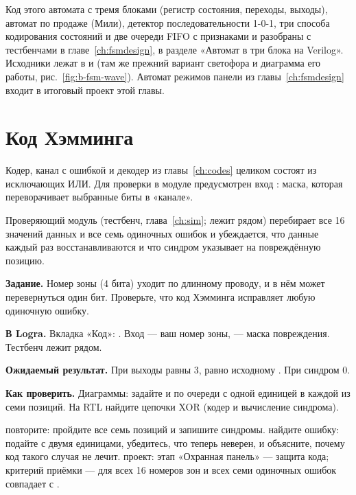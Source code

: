 Код этого автомата с тремя блоками (регистр состояния, переходы, выходы),
автомат по продаже (Мили), детектор последовательности 1-0-1, три способа
кодирования состояний и две очереди FIFO с признаками  и
 разобраны с тестбенчами в главе~\ref{ch:fsmdesign}, в разделе
«Автомат в три блока на Verilog». Исходники лежат в  и
 (там же прежний вариант светофора 
и диаграмма его работы, рис.~\ref{fig:b-fsm-wave}). Автомат режимов панели из
главы~\ref{ch:fsmdesign} входит в итоговый проект этой главы.

\section{Код Хэмминга}

Кодер, канал с ошибкой и декодер из главы~\ref{ch:codes} целиком состоят из
исключающих ИЛИ. Для проверки в модуле предусмотрен вход : маска,
которая переворачивает выбранные биты в «канале».



Проверяющий модуль  (тестбенч, глава~\ref{ch:sim}; лежит
рядом) перебирает все 16
значений данных и все семь одиночных ошибок и убеждается, что данные каждый
раз восстанавливаются и что синдром указывает на повреждённую позицию.

\begin{diybox}
\textbf{Задание.} Номер зоны (4 бита) уходит по длинному проводу, и в нём может перевернуться один бит. Проверьте, что код Хэмминга исправляет любую одиночную ошибку.

\textbf{В Logra.} Вкладка «Код»: . Вход  --- ваш номер зоны,  --- маска повреждения. Тестбенч  лежит рядом.

\textbf{Ожидаемый результат.} При  выходы  равны 3,  равно исходному . При  синдром 0.

\textbf{Как проверить.} Диаграммы: задайте  и по очереди  с одной единицей в каждой из семи позиций. На RTL найдите цепочки XOR (кодер и вычисление синдрома).

 повторите: пройдите все семь позиций и запишите синдромы.  найдите ошибку: подайте  с двумя единицами, убедитесь, что  теперь неверен, и объясните, почему код такого случая не лечит.  проект: этап «Охранная панель» --- защита кода; критерий приёмки --- для всех 16 номеров зон и всех семи одиночных ошибок  совпадает с .
\end{diybox}

